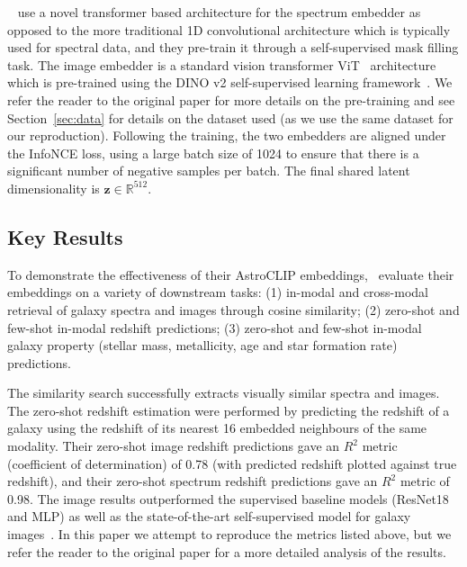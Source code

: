 ~\cite{astroclip} use a novel transformer based architecture for the spectrum embedder as opposed to the more traditional
1D convolutional architecture which is typically used for spectral data, and they pre-train it through a self-supervised
mask filling task.
The image embedder is a standard vision transformer ViT~\citep{dosovitskiy2021} architecture which is pre-trained using
the DINO v2 self-supervised learning framework~\citep{oquab2024}.
We refer the reader to the original paper for more details on the pre-training and see Section~\eqref{sec:data} for details
on the dataset used (as we use the same dataset for our reproduction).
Following the training, the two embedders are aligned under the InfoNCE loss, using a large batch size of 1024 to ensure
that there is a significant number of negative samples per batch.
The final shared latent dimensionality is $\mathbf{z} \in \mathbb{R}^{512}$.

\subsection{Key Results}\label{subsec:original-paper-key-results}
To demonstrate the effectiveness of their AstroCLIP embeddings,~\cite{astroclip} evaluate their embeddings on a variety
of downstream tasks: (1) in-modal and cross-modal retrieval of galaxy spectra and images through cosine similarity; (2)
zero-shot and few-shot in-modal redshift predictions; (3) zero-shot and few-shot in-modal galaxy property
(stellar mass, metallicity, age and star formation rate) predictions.

The similarity search successfully extracts visually similar spectra and images.
The zero-shot redshift estimation were performed by predicting the redshift of a galaxy using the redshift of its nearest
16 embedded neighbours of the same modality.
Their zero-shot image redshift predictions gave an $R^{2}$ metric (coefficient of determination) of 0.78 (with predicted
redshift plotted against true redshift), and their zero-shot spectrum redshift predictions gave an $R^{2}$ metric of 0.98.
The image results outperformed the supervised baseline models (ResNet18 and MLP) as well as the state-of-the-art
self-supervised model for galaxy images~\citep{stein2021}.
In this paper we attempt to reproduce the metrics listed above, but we refer the reader to the original paper for a
more detailed analysis of the results.
